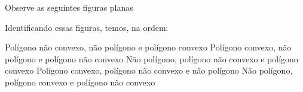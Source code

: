 Observe as seguintes figuras planas
\vspace{-1mm}
\begin{center}
\end{center}
\vspace{-2mm}
Identificando essas figuras, temos, na ordem:

Polígono não convexo, não polígono e polígono convexo
Polígono convexo, não polígono e polígono não convexo
Não polígono, polígono não convexo e polígono convexo
Polígono convexo, polígono não convexo e não polígono
Não polígono, polígono convexo e polígono não convexo


